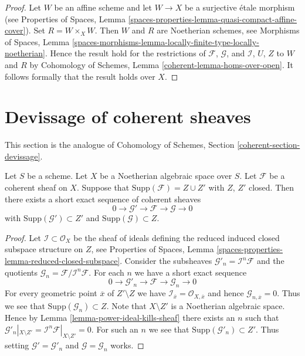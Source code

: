 \begin{proof}
Let $W$ be an affine scheme and let $W \to X$ be a surjective \'etale
morphism (see Properties of Spaces, Lemma
\ref{spaces-properties-lemma-quasi-compact-affine-cover}).
Set $R = W \times_X W$. Then $W$ and $R$ are Noetherian schemes, see
Morphisms of Spaces, Lemma
\ref{spaces-morphisms-lemma-locally-finite-type-locally-noetherian}.
Hence the result hold for the restrictions of $\mathcal{F}$, $\mathcal{G}$,
and $\mathcal{I}$, $U$, $Z$ to $W$ and $R$ by
Cohomology of Schemes, Lemma \ref{coherent-lemma-homs-over-open}.
It follows formally that the result holds over $X$.
\end{proof}






\section{Devissage of coherent sheaves}
\label{section-devissage}

\noindent
This section is the analogue of
Cohomology of Schemes, Section \ref{coherent-section-devissage}.

\begin{lemma}
\label{lemma-prepare-filter-support}
Let $S$ be a scheme. Let $X$ be a Noetherian algebraic space over $S$.
Let $\mathcal{F}$ be a coherent sheaf on $X$. Suppose that
$\text{Supp}(\mathcal{F}) = Z \cup Z'$ with $Z$, $Z'$ closed.
Then there exists a short exact sequence of coherent sheaves
$$
0 \to \mathcal{G}' \to \mathcal{F} \to \mathcal{G} \to 0
$$
with $\text{Supp}(\mathcal{G}') \subset Z'$ and
$\text{Supp}(\mathcal{G}) \subset Z$.
\end{lemma}

\begin{proof}
Let $\mathcal{I} \subset \mathcal{O}_X$ be the sheaf of ideals
defining the reduced induced closed subspace structure on $Z$, see
Properties of Spaces, Lemma
\ref{spaces-properties-lemma-reduced-closed-subspace}.
Consider the subsheaves
$\mathcal{G}'_n = \mathcal{I}^n\mathcal{F}$ and the
quotients $\mathcal{G}_n = \mathcal{F}/\mathcal{I}^n\mathcal{F}$.
For each $n$ we have a short exact sequence
$$
0 \to \mathcal{G}'_n \to \mathcal{F} \to \mathcal{G}_n \to 0
$$
For every geometric point $\overline{x}$ of $Z' \setminus Z$ we have
$\mathcal{I}_{\overline{x}} = \mathcal{O}_{X, \overline{x}}$
and hence $\mathcal{G}_{n, \overline{x}} = 0$. Thus we see that
$\text{Supp}(\mathcal{G}_n) \subset Z$. Note that $X \setminus Z'$
is a Noetherian algebraic space. Hence by
Lemma \ref{lemma-power-ideal-kills-sheaf}
there exists an $n$ such that $\mathcal{G}'_n|_{X \setminus Z'} =
\mathcal{I}^n\mathcal{F}|_{X \setminus Z'} = 0$.
For such an $n$ we see that $\text{Supp}(\mathcal{G}'_n) \subset Z'$.
Thus setting $\mathcal{G}' = \mathcal{G}'_n$ and $\mathcal{G} = \mathcal{G}_n$
works.
\end{proof}

